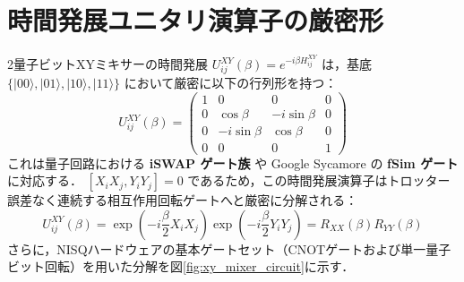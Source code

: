 \documentclass[11pt,a4paper,oneside,openany]{ltjsbook}
\theoremstyle{definition}
\theoremstyle{plain}
\theoremstyle{remark}
\newcommand{\ket}[1]{|#1\rangle}
\begin{document}
\section{時間発展ユニタリ演算子の厳密形}
2量子ビットXYミキサーの時間発展 $U_{ij}^{XY}(\beta) = e^{-i \beta H_{ij}^{XY}}$ は，基底 $\{\ket{00}, \ket{01}, \ket{10}, \ket{11}\}$ において厳密に以下の行列形を持つ：
\begin{equation}
    U_{ij}^{XY}(\beta) = \begin{pmatrix}
        1 & 0 & 0 & 0 \\
        0 & \cos\beta & -i\sin\beta & 0 \\
        0 & -i\sin\beta & \cos\beta & 0 \\
        0 & 0 & 0 & 1
    \end{pmatrix}
\end{equation}
これは量子回路における \textbf{iSWAP ゲート族} や Google Sycamore の \textbf{fSim ゲート} に対応する．
$[X_i X_j, Y_i Y_j] = 0$ であるため，この時間発展演算子はトロッター誤差なく連続する相互作用回転ゲートへと厳密に分解される：
\begin{equation}
    U_{ij}^{XY}(\beta) = \exp\left(-i \frac{\beta}{2} X_i X_j\right) \exp\left(-i \frac{\beta}{2} Y_i Y_j\right) = R_{XX}(\beta) R_{YY}(\beta)
\end{equation}
さらに，NISQハードウェアの基本ゲートセット（CNOTゲートおよび単一量子ビット回転）を用いた分解を図\ref{fig:xy_mixer_circuit}に示す．
\end{document}
